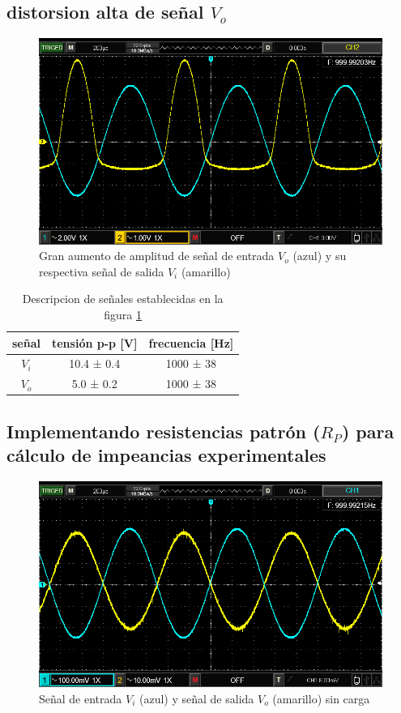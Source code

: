 \documentclass[12pt, a4paper]{article}
\begin{document}
    \subsection{distorsion alta de señal $V_o$}

    \begin{figure}[h!]
        \centering
        \includegraphics[height=6cm\textwidth]{p25ViVomax.png}
        \caption{Gran aumento de amplitud de señal de entrada $V_o$ (azul) y su respectiva señal de salida $V_i$ (amarillo)}
        \label{fig:disVimax}
    \end{figure}

    \newpage

    \begin{table}[h!]
        \centering
        \caption{Descripcion de señales establecidas en la figura \ref{fig:disVimax}}
        \label{tab:p25}
        \begin{tabular}{|c|c|c|} \hline
            señal  &  tensión p-p [V] & frecuencia [Hz] \\ \hline
            $V_i$  &  10.4 ± 0.4 &  1000 ± 38  \\
            $V_o$  &  5.0 ± 0.2 &  1000 ± 38  \\ \hline
        \end{tabular}
    \end{table}

    \subsection{Implementando resistencias patrón ($R_P$) para cálculo de impeancias experimentales}

    \begin{figure}[h!]
        \centering
        \includegraphics[height=6cm\textwidth]{p26sc.png}
        \caption{Señal de entrada $V_i$ (azul) y señal de salida $V_o$ (amarillo) sin carga}
        \label{fig:RPsc}
    \end{figure}
\end{document}
